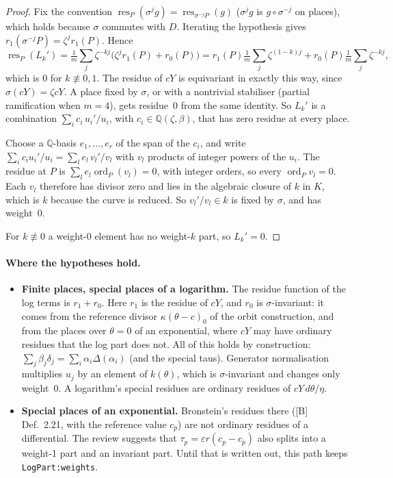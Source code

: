 \documentclass[11pt]{article}
\theoremstyle{definition}
\theoremstyle{remark}
\newcommand{\Q}{\mathbb{Q}}
\newcommand{\code}[1]{\texttt{#1}}
\begin{document}
\begin{proof}
Fix the convention $\operatorname{res}_P(\sigma^j g)=\operatorname{res}_{\sigma^{-j}P}(g)$
($\sigma^j g$ is $g\circ\sigma^{-j}$ on places), which holds because $\sigma$
commutes with $D$. Iterating the hypothesis gives
$r_1(\sigma^{-j}P)=\zeta^jr_1(P)$. Hence
\[ \operatorname{res}_P(L_k')=\tfrac1m\sum_j\zeta^{-kj}\bigl(\zeta^{j}r_1(P)+r_0(P)\bigr)
   =r_1(P)\tfrac1m\sum_j\zeta^{(1-k)j}+r_0(P)\tfrac1m\sum_j\zeta^{-kj}, \]
which is $0$ for $k\not\equiv0,1$. The residue of $cY$ is equivariant in exactly
this way, since $\sigma(cY)=\zeta cY$. A place fixed by $\sigma$, or with a
nontrivial stabiliser (partial ramification when $m=4$), gets residue~0 from
the same identity. So $L_k'$ is a combination $\sum_ic_i\,u_i'/u_i$, with
$c_i\in\Q(\zeta,\beta)$, that has zero residue at every place.

Choose a $\Q$-basis $e_1,\dots,e_r$ of the span of the $c_i$, and write
$\sum_ic_iu_i'/u_i=\sum_le_l\,v_l'/v_l$ with $v_l$ products of integer powers
of the $u_i$. The residue at $P$ is $\sum_le_l\operatorname{ord}_P(v_l)=0$, with
integer orders, so every $\operatorname{ord}_Pv_l=0$. Each $v_l$ therefore has
divisor zero and lies in the algebraic closure of $k$ in $K$, which is $k$
because the curve is reduced. So $v_l'/v_l\in k$ is fixed by $\sigma$, and has
weight~0.

For $k\not\equiv0$ a weight-0 element has no weight-$k$ part, so $L_k'=0$.
\end{proof}

\paragraph{Where the hypotheses hold.}
\begin{itemize}
\item \textbf{Finite places, special places of a logarithm.} The residue function
  of the log terms is $r_1+r_0$. Here $r_1$ is the residue of $cY$, and $r_0$
  is $\sigma$-invariant: it comes from the reference divisor
  $\kappa(\theta-c)_0$ of the orbit construction, and from the places over
  $\theta=0$ of an exponential, where $cY$ may have ordinary residues that the
  log part does not. All of this holds by construction: $\sum_j\beta_j\delta_j=\sum_i\alpha_i\Delta(\alpha_i)$
  (and the special taus). Generator normalisation multiplies $u_j$ by an
  element of $k(\theta)$, which is $\sigma$-invariant and changes only
  weight~0. A logarithm's special residues are ordinary residues of
  $cY\,d\theta/\eta$.
\item \textbf{Special places of an exponential.} Bronstein's residues there
  ([B] Def.~2.21, with the reference value $c_{\bar p}$) are not ordinary
  residues of a differential. The review suggests that
  $\tau_p=\varepsilon r(c_p-c_{\bar p})$ also splits into a weight-1 part and an
  invariant part. Until that is written out, this path keeps
  \code{LogPart:weights}.
\end{itemize}
\end{document}
